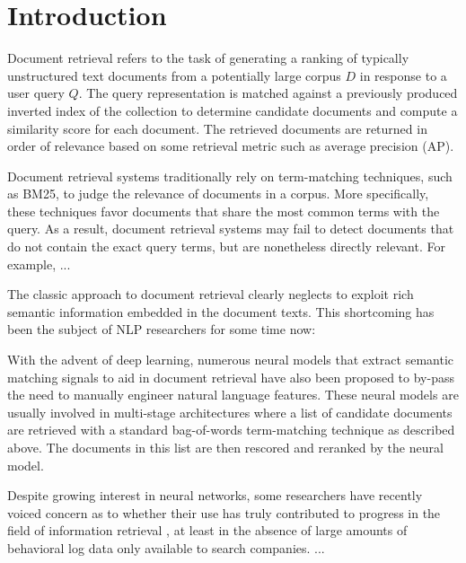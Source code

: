 \chapter{Introduction}

Document retrieval refers to the task of generating a ranking of typically unstructured text documents from a potentially large corpus $ D $ in response to a user query $ Q $.
The query representation is matched against a previously produced inverted index of the collection to determine candidate documents and compute a similarity score for each document.
The retrieved documents are returned in order of relevance based on some retrieval metric such as average precision (AP).

Document retrieval systems traditionally rely on term-matching techniques, such as BM25, to judge the relevance of documents in a corpus.
More specifically, these techniques favor documents that share the most common terms with the query.
As a result, document retrieval systems may fail to detect documents that do not contain the exact query terms, but are nonetheless directly relevant.
For example, ...

The classic approach to document retrieval clearly neglects to exploit rich semantic information embedded in the document texts.
This shortcoming has been the subject of NLP researchers for some time now:\

With the advent of deep learning, numerous neural models that extract semantic matching signals to aid in document retrieval have also been proposed to by-pass the need to manually engineer natural language features.
These neural models are usually involved in multi-stage architectures where a list of candidate documents are retrieved with a standard bag-of-words term-matching technique as described above.
The documents in this list are then rescored and reranked by the neural model.
\myworries{Some notable examples include...}

Despite growing interest in neural networks, some researchers have recently voiced concern as to whether their use has truly contributed to progress in the field of information retrieval , at least in the absence of large amounts of behavioral log data only available to search companies.
...


